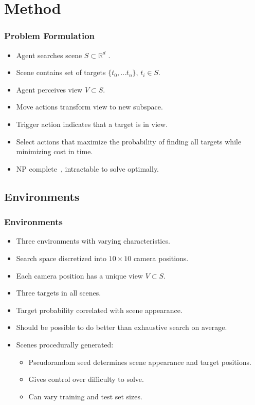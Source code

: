 \section{Method}

\begin{frame}
    \frametitle{Problem Formulation}

    \begin{itemize}
        \item Agent searches scene \(S \subset \mathbb{R}^d\) .
        \item Scene contains set of targets \(\{t_0, \dots t_n\}\), \(t_i \in S\).
        \item Agent perceives view \(V \subset S\).
        \item Move actions transform view to new subspace.
        \item Trigger action indicates that a target is in view.
        \item Select actions that maximize the probability of finding all targets while minimizing cost in time.
        \item NP complete~\cite{andreopoulos_theory_2009}, intractable to solve optimally.
    \end{itemize}
\end{frame}

\subsection{Environments}

\begin{frame}
    \frametitle{Environments}
    
    \begin{itemize}
        \item Three environments with varying characteristics.
        \item Search space discretized into \(10 \times 10\) camera positions.
        \item Each camera position has a unique view \(V \subset S\).
        \item Three targets in all scenes.
        \item Target probability correlated with scene appearance.
        \item Should be possible to do better than exhaustive search on average.
        \item Scenes procedurally generated:
        \begin{itemize}
            \item Pseudorandom seed determines scene appearance and target positions.
            \item Gives control over difficulty to solve.
            \item Can vary training and test set sizes.
        \end{itemize}
    \end{itemize}
\end{frame}

